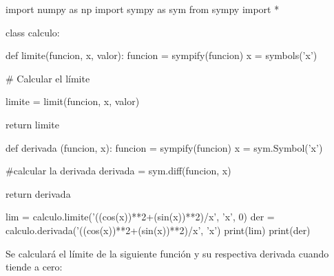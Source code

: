 \documentclass[a4paper]{article}
\begin{document}
\begin{pycode}
import numpy as np
import sympy as sym
from sympy import *

class calculo:

    def limite(funcion, x, valor):
        funcion = sympify(funcion) 
        x = symbols('x')

        # Calcular el límite

        limite = limit(funcion, x, valor)
        
        return limite

    def derivada (funcion, x):
            funcion = sympify(funcion)
            x = sym.Symbol('x')
            
            #calcular la derivada
            derivada = sym.diff(funcion, x)
            
        return derivada

lim = calculo.limite('((cos(x))**2+(sin(x))**2)/x', 'x', 0)
der = calculo.derivada('((cos(x))**2+(sin(x))**2)/x', 'x')
print(lim)
print(der)

\end{pycode}

Se calculará el límite de la siguiente función y su respectiva derivada cuando tiende a cero:
\end{document}
